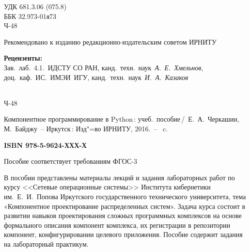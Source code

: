\documentclass[14pt,a4paper,openany,twoside,final]{extbook}
\newcommand\e[1]{#1}
\begin{document}
\newpage{}
\begin{mygroup}
\thispagestyle{empty}
\noindent УДК 681.3.06 (075.8)\\ %
\noindent ББК 32.973-01я73\\ %
\noindent\mbox{}\hspace{2em}Ч-48 %
\begin{center}\small
Рекомендовано к изданию редакционно-издательским советом ИРНИТУ\\[2ex]
\end{center}
\vfill
\begin{center}\small
\textbf{Рецензенты:} \\
Зав.~лаб.~4.1.~ИДСТУ СО РАН, канд.~техн.~наук~{\em А.~Е.~Хмельнов},\\
доц.~каф.~ИС.~ИМЭИ~ИГУ, канд.~техн.~наук~{\em И.~А.~Казаков}
\end{center}
\vfill
\noindent\begin{minipage}[t]{2em}
\noindent\mbox{}\\
Ч-48
\end{minipage}%
\begin{minipage}[t]{0.95\linewidth}
\setlength{\parindent}{5ex}

Компонентное программирование в Python\,{}: учеб.~пособие\,/~Е.~А.~Черкашин, М.~Байджу~-- Иркутск\,: Изд"=во ИРНИТУ, 2016.~-- \pageref{lastpage}~c.

{\bfseries \e{ISBN 978-5-9624-ХХХ-Х}}
\vspace{2ex}

\begingroup\small\parskip0pt
\vspace{1ex}

Пособие соответствует требованиям ФГОС-3

В пособии представлены материалы лекций и задания лабораторных работ по курсу <<Сетевые операционные системы>> Института кибернетики им.~Е.~И.~Попова Иркутского государственного технического университета, тема  «Компонентное проектирование распределенных систем».  Задача курса состоит в развитии навыков проектирования сложных программных комплексов на основе формального описания компонент комплекса, их регистрации в репозитории компонент, конфигурировании целевого приложения.  Пособие содержит задания на лабораторный практикум.


\end{minipage}
\end{mygroup}
\end{document}
